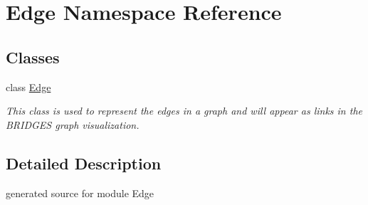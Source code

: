 \hypertarget{namespace_edge}{}\section{Edge Namespace Reference}
\label{namespace_edge}
\subsection*{Classes}
\begin{DoxyCompactItemize}
\item 
class \hyperlink{class_edge_1_1_edge}{Edge}
\begin{DoxyCompactList}\small\item\em This class is used to represent the edges in a graph and will appear as links in the B\+R\+I\+D\+G\+ES graph visualization. \end{DoxyCompactList}\end{DoxyCompactItemize}


\subsection{Detailed Description}
\begin{DoxyVerb}generated source for module Edge \end{DoxyVerb}
 